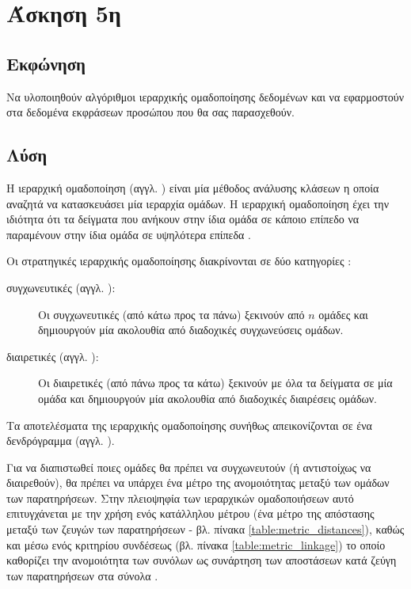 \documentclass{assignment}
\begin{document}
\section{Άσκηση 5η}
\subsection{Εκφώνηση}

Να υλοποιηθούν αλγόριθμοι ιεραρχικής ομαδοποίησης δεδομένων και να εφαρμοστούν στα δεδομένα εκφράσεων προσώπου που θα σας παρασχεθούν.

\subsection {Λύση}

Η ιεραρχική ομαδοποίηση (αγγλ. ) είναι μία μέθοδος ανάλυσης κλάσεων η οποία αναζητά να κατασκευάσει μία ιεραρχία ομάδων. Η ιεραρχική ομαδοποίηση έχει την ιδιότητα ότι τα δείγματα που ανήκουν στην ίδια ομάδα σε κάποιο επίπεδο να παραμένουν στην ίδια ομάδα σε υψηλότερα επίπεδα \cite{wiki:hierarchical_clustering, class_notes}.

Οι στρατηγικές ιεραρχικής ομαδοποίησης διακρίνονται σε δύο κατηγορίες \cite{wiki:hierarchical_clustering, class_notes}:
\begin{description}
\item[συγχωνευτικές (αγγλ. ):] Οι συγχωνευτικές (από κάτω προς τα πάνω) ξεκινούν από $n$ ομάδες και δημιουργούν μία ακολουθία από διαδοχικές συγχωνεύσεις ομάδων.
\item[διαιρετικές (αγγλ. ):]  Οι διαιρετικές (από πάνω προς τα κάτω) ξεκινούν με όλα τα δείγματα σε μία ομάδα και δημιουργούν μία ακολουθία από διαδοχικές διαιρέσεις ομάδων.
\end{description}
 
Τα αποτελέσματα της ιεραρχικής ομαδοποίησης συνήθως απεικονίζονται σε ένα δενδρόγραμμα (αγγλ. ).

Για να διαπιστωθεί ποιες ομάδες θα πρέπει να συγχωνευτούν (ή αντιστοίχως να διαιρεθούν), θα πρέπει να υπάρχει ένα μέτρο της ανομοιότητας μεταξύ των ομάδων των παρατηρήσεων. Στην πλειοψηφία των ιεραρχικών ομαδοποιήσεων αυτό επιτυγχάνεται με την χρήση ενός κατάλληλου μέτρου (ένα μέτρο της απόστασης μεταξύ των ζευγών των παρατηρήσεων - βλ. πίνακα \ref{table:metric_distances}), καθώς και μέσω ενός κριτηρίου συνδέσεως (βλ. πίνακα \ref{table:metric_linkage}) το οποίο καθορίζει την ανομοιότητα των συνόλων ως συνάρτηση των αποστάσεων κατά ζεύγη των παρατηρήσεων στα σύνολα \cite{wiki:hierarchical_clustering}.
\end{document}
